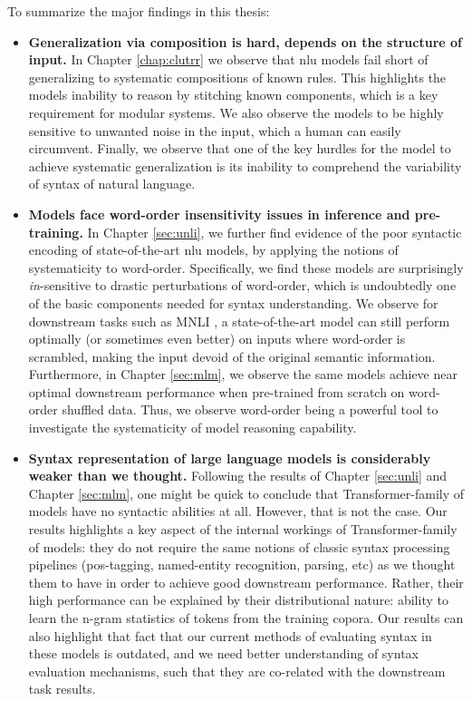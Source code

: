 \documentclass[letterpaper, 12pt]{report}
\begin{document}
To summarize the major findings in this thesis:

\begin{itemize}
  \item \textbf{Generalization via composition is hard, depends on the structure of input.} In Chapter \autoref{chap:clutrr} we observe that \acrshort{nlu} models fail short of generalizing to systematic compositions of known rules. This highlights the models inability to reason by stitching known components, which is a key requirement for modular systems. We also observe the models to be highly sensitive to unwanted noise in the input, which a human can easily circumvent. Finally, we observe that one of the key hurdles for the model to achieve systematic generalization is its inability to comprehend the variability of syntax of natural language.

  \item \textbf{Models face word-order insensitivity issues in inference and pre-training.} In Chapter \autoref{sec:unli}, we further find evidence of the poor syntactic encoding of state-of-the-art \acrshort{nlu} models, by applying the notions of systematicity to word-order. Specifically, we find these models are surprisingly \textit{in}-sensitive to drastic perturbations of word-order, which is undoubtedly one of the basic components needed for syntax understanding. We observe for downstream tasks such as MNLI \citep{williams-etal-2018-broad}, a state-of-the-art model can still perform optimally (or sometimes even better) on inputs where word-order is scrambled, making the input devoid of the original semantic information. Furthermore, in Chapter \autoref{sec:mlm}, we observe the same models achieve near optimal downstream performance when pre-trained from scratch on word-order shuffled data. Thus, we observe word-order being a powerful tool to investigate the systematicity of model reasoning capability.

  \item \textbf{Syntax representation of large language models is considerably weaker than we thought.} Following the results of Chapter \autoref{sec:unli} and Chapter \autoref{sec:mlm}, one might be quick to conclude that Transformer-family of models have no syntactic abilities at all. However, that is not the case. Our results highlights a key aspect of the internal workings of Transformer-family of models: they do not require the same notions of classic syntax processing pipelines (pos-tagging, named-entity recognition, parsing, etc) as we thought them to have in order to achieve good downstream performance. Rather, their high performance can be explained by their distributional nature: ability to learn the n-gram statistics of tokens from the training copora. Our results can also highlight that fact that our current methods of evaluating syntax in these models is outdated, and we need better understanding of syntax evaluation mechanisms, such that they are co-related with the downstream task results.


\end{itemize}
\end{document}
